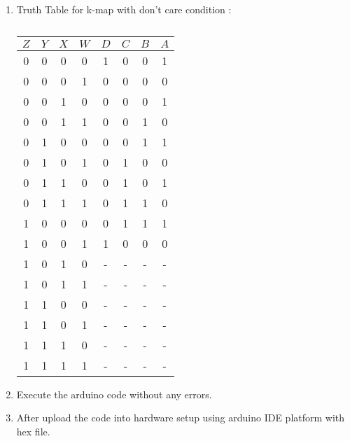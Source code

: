 \documentclass[conference]{IEEEtran}
\begin{document}
\begin{enumerate}
\item {Truth Table for k-map with don't care condition : }

\begin{table}[htbp]
    \centering
\begin{tabular}
{ | c | c | c | c | c | c | c | c | } \hline
$Z$ & $Y$ & $X$ & $W$ & $D$ & $C$ & $B$ & $A$\\\hline
0   & 0   & 0   & 0   & 1  & 0 & 0  & 1 \\
0   & 0   & 0   & 1   & 0  & 0 & 0  & 0 \\
0   & 0   & 1   & 0   & 0  & 0 & 0  & 1 \\
0   & 0   & 1   & 1   & 0  & 0 & 1  & 0 \\
0   & 1   & 0   & 0   & 0  & 0 & 1  & 1 \\  
0   & 1   & 0   & 1   & 0  & 1 & 0  & 0 \\
0   & 1   & 1   & 0   & 0  & 1 & 0  & 1 \\  
0   & 1   & 1   & 1   & 0  & 1 & 1  & 0 \\
1   & 0   & 0   & 0   & 0  & 1 & 1  & 1 \\
1   & 0   & 0   & 1   & 1  & 0 & 0  & 0 \\
1   & 0   & 1   & 0   & -  & - & -  & - \\ 
1   & 0   & 1   & 1   & -  & - & -  & - \\
1   & 1   & 0   & 0   & -  & - & -  & - \\
1   & 1   & 0   & 1   & -  & - & -  & - \\
1   & 1   & 1   & 0   & -  & - & -  & - \\
1   & 1   & 1   & 1   & -  & - & -  & - \\ \hline
\end{tabular}
\vspace{0.1cm}
\caption{\label{tab:widgets}}
\end{table}
	
\item Execute the arduino code without any errors.
\item After upload the code into hardware setup using arduino IDE platform with hex file.
 \end{enumerate}
\end{document}
